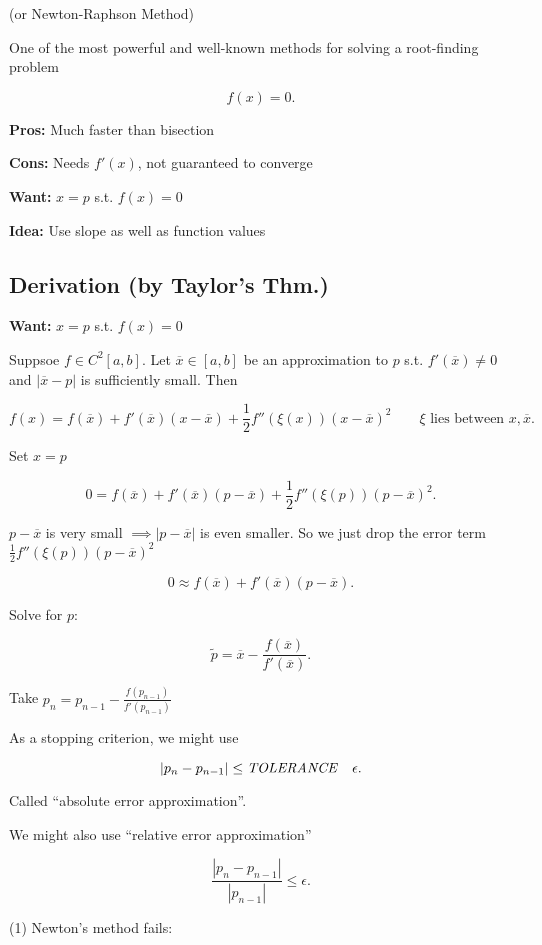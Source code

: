 \documentclass[12pt]{article}
\begin{document}
(or Newton-Raphson Method)

One of the most powerful and well-known methods for solving a root-finding problem

\[
f(x) = 0
.\]

\textbf{Pros:} Much faster than bisection

\textbf{Cons:} Needs $f'(x)$, not guaranteed to converge

\textbf{Want:} $x=p$ s.t. $f(x)=0$

\textbf{Idea:} Use slope as well as function values

\subsection{Derivation (by Taylor's Thm.)}

\textbf{Want:} $x=p$ s.t. $f(x) = 0$

Suppsoe $f\in C^2[a,b]$. Let $\overline{x} \in [a,b]$ be an approximation to $p$
s.t. $f'(\overline{x})\ne 0$ and $|\overline{x}-p|$ is sufficiently small. Then

\[
  f(x) = f(\overline{x}) + f'(\overline{x})(x - \overline{x}) + \frac{1}{2}f''(\xi(x))(x-\overline{x})^2 \qquad \xi\text{ lies between } x, \overline{x}
.\]

Set $x=p$

\[
0 = f(\overline{x}) + f'(\overline{x}) (p - \overline{x}) + \frac{1}{2}f''(\xi(p))(p-\overline{x})^2
.\]

$p- \overline{x}$ is very small $\implies |p- \overline{x}|$ is even smaller.
So we just drop the error term $\frac{1}{2}f''(\xi(p))(p-\overline{x})^2$

\[
  0 \approx f(\overline{x}) + f'(\overline{x}) (p-\overline{x})
.\]

Solve for $p$:

\[
  \tilde{p} = \overline{x} - \frac{f(\overline{x})}{f'(\overline{x})}
.\]

Take $p_n = p_{n-1} - \frac{f(p_{n-1})}{f'(p_{n-1})}$ 

As a stopping criterion, we might use 

\[
  |p_n-p_{n-1}| \leq \text{\textit{TOLERANCE}} \quad \epsilon
.\]

Called \enquote{absolute error approximation}.

We might also use \enquote{relative error approximation}

\[
  \frac{|p_n - p_{n-1}|}{|p_{n-1}|} \leq \epsilon
.\]

(1) Newton's method fails:
\end{document}
